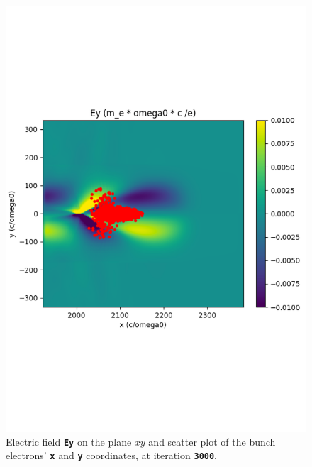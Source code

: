 \documentclass{article}
\newcommand{\commandline}[1]{\texttt{\textbf{#1}}}
\begin{document}
\begin{figure}[!htb]
\begin{minipage}{0.48\textwidth}
     \includegraphics[width=1\linewidth]{EyScatterXY.pdf}
     \caption{Electric field \commandline{Ey} on the plane $xy$ and scatter plot of the bunch electrons' \commandline{x} and \commandline{y} coordinates, at iteration \commandline{3000}. }\label{EyScatterXY}
   \end{minipage}
\end{figure}







 
\end{document}
